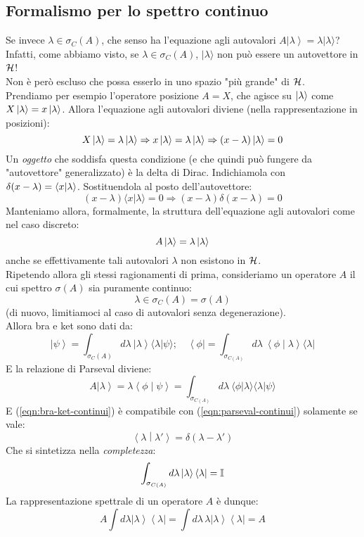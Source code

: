 \documentclass[12pt]{article}
\begin{document}
\subsection{Formalismo per lo spettro continuo}
Se invece $\lambda \in \sigma_C\left(A\right)$, che senso ha l'equazione agli autovalori $A\left|\lambda\right\rangle=\lambda |\lambda  \rangle$?\\
Infatti, come abbiamo visto, se $\lambda \in \sigma_C(A)$, $|\lambda\rangle$  non può essere un autovettore in $\mathcal{H}$!\\
Non è però escluso che possa esserlo in uno spazio "più grande" di $\mathcal{H}$.\\
Prendiamo per esempio l'operatore posizione $A=X$, che agisce su $\ket{\lambda}$ come $X\ket{\lambda} = x \ket{\lambda}$. Allora l'equazione agli autovalori diviene (nella rappresentazione in posizioni):
\[
X\ket{\lambda} = \lambda\ket{\lambda} \Rightarrow x\ket{\lambda} = \lambda\ket{\lambda} \Rightarrow (x-\lambda)\ket{\lambda} = 0
\]
Un \textit{oggetto} che soddisfa questa condizione (e che quindi può fungere da "autovettore" generalizzato) è la delta di Dirac. Indichiamola con $\delta(x-\lambda) = \braket{x|\lambda}$. Sostituendola al posto dell'autovettore:
\[
(x-\lambda )\langle x | \lambda \rangle = 0 \Rightarrow (x-\lambda)\delta(x-\lambda) = 0
\]
Manteniamo allora, formalmente, la struttura dell'equazione agli autovalori come nel caso discreto:
\[
A\ket{\lambda} = \lambda \ket{\lambda}
\]
anche se effettivamente tali autovalori $\lambda$ non esistono in $\mathcal{H}$.\\
Ripetendo allora gli stessi ragionamenti di prima, consideriamo un operatore $A$ il cui spettro $\sigma(A)$ sia puramente continuo:
\[
\lambda \in \sigma_C\left(A\right)=\sigma (A)
\]
(di nuovo, limitiamoci al caso di autovalori senza degenerazione).\\
Allora bra e ket sono dati da:
\begin{equation}
\left|\psi\right\rangle= \int_{\sigma_C(A)}{d\lambda\ \left|\lambda\right\rangle\langle\lambda|\psi\rangle };\quad
\left\langle\phi\right|= \int_{\sigma_{C\left(A\right)}}{d\lambda\ \left\langle\phi\middle|\lambda\right\rangle\langle\lambda|}
\label{eqn:bra-ket-continui}
\end{equation}
E la relazione di Parseval diviene:
\begin{equation}
    A\left|\lambda\right\rangle=\lambda 
\left\langle\phi\middle|\psi\right\rangle= \int_{\sigma_{C\left(A\right)}}{d\lambda\ \langle\phi|\lambda\rangle \langle\lambda|\psi\rangle }
    \label{eqn:parseval-continui}
\end{equation}
E (\ref{eqn:bra-ket-continui}) è compatibile con (\ref{eqn:parseval-continui}) solamente se vale:
\[
\left\langle\lambda\middle|\lambda'\right\rangle= \delta \left(\lambda-\lambda'\right)
\]
Che si sintetizza nella \textit{completezza}:
\[
\int_{\sigma_{C\left(A\right)}}{d\lambda\left|\lambda\right\rangle\left\langle\lambda\right|}=\mathbb{I}
\]
La rappresentazione spettrale di un operatore $A$ è dunque:
\[
A\int d\lambda  \left|\lambda\right\rangle\left\langle\lambda\right|=\int d\lambda\,\lambda \left|\lambda\right\rangle\left\langle\lambda\right|=A 
\]
\end{document}
